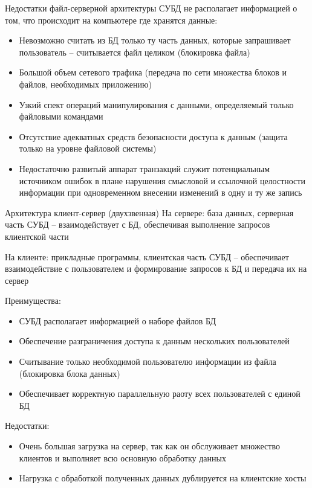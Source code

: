 \documentclass[12pt]{article}
\begin{document}
\begin{nota}{Недостатки файл-серверной архитектуры}
    СУБД не располагает информацией о том, что происходит на компьютере где хранятся данные:

    \begin{itemize}
        \item Невозможно считать из БД только ту часть данных, которые запрашивает пользователь -- считывается файл целиком (блокировка файла) 
        \item Большой объем сетевого трафика (передача по сети множества блоков и файлов, необходимых приложению)
        \item Узкий спект операций манипулирования с данными, определяемый только файловыми командами 
        \item Отсутствие адекватных средств безопасности доступа к данным (защита только на уровне файловой системы)
        \item Недостаточно развитый аппарат транзакций служит потенциальным источником ошибок в плане нарушения смысловой и ссылочной целостности информации при одновременном внесении изменений в одну и ту же запись 
    \end{itemize}
\end{nota}

\begin{defin}{Архитектура клиент-сервер (двухзвенная)}
    На сервере: база данных, серверная часть СУБД -- взаимодействует с БД, обеспечивая выполнение запросов клиентской части 

    На клиенте: прикладные программы, клиентская часть СУБД -- обеспечивает взаимодействие с пользователем и формирование запросов к БД и передача их на сервер

    Преимущества:

    \begin{itemize}
        \item СУБД располагает информацией о наборе файлов БД
        \item Обеспечение разграничения доступа к данным нескольких пользователей 
        \item Считывание только необходимой пользователю информации из файла (блокировка блока данных)
        \item Обеспечивает корректную параллельную раоту всех пользователей с единой БД 
    \end{itemize}

    Недостатки: 

    \begin{itemize}
        \item Очень большая загрузка на сервер, так как он обслуживает множество клиентов и выполняет всю основную обработку данных 
        \item Нагрузка с обработкой полученных данных дублируется на клиентские хосты 
    \end{itemize}
\end{defin}
\end{document}
